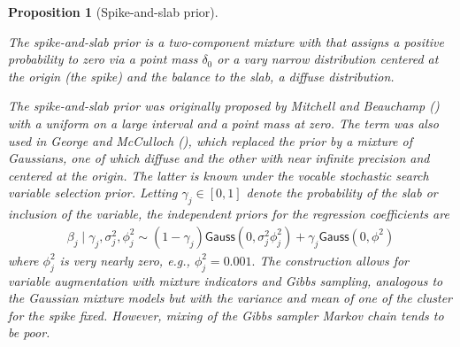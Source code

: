 \documentclass[
  11pt,
  letterpaper,
]{scrbook}
\theoremstyle{plain}
\theoremstyle{plain}
\newtheorem{proposition}{Proposition}[chapter]
\theoremstyle{definition}
\theoremstyle{definition}
\theoremstyle{definition}
\theoremstyle{plain}
\theoremstyle{remark}
\begin{document}
\begin{proposition}[Spike-and-slab
prior]\protect\hypertarget{prp-spike-slab}{}\label{prp-spike-slab}

The spike-and-slab prior is a two-component mixture with that assigns a
positive probability to zero via a point mass \(\delta_0\) or a vary
narrow distribution centered at the origin (the spike) and the balance
to the slab, a diffuse distribution.

The spike-and-slab prior was originally proposed by Mitchell and
Beauchamp () with a uniform
on a large interval and a point mass at zero. The term was also used in
George and McCulloch (), which
replaced the prior by a mixture of Gaussians, one of which diffuse and
the other with near infinite precision and centered at the origin. The
latter is known under the vocable stochastic search variable selection
prior. Letting \(\gamma_j \in [0,1]\) denote the probability of the slab
or inclusion of the variable, the independent priors for the regression
coefficients are \begin{align*}
 \beta_j \mid \gamma_j, \sigma_j^2,\phi^2_j \sim (1-\gamma_j) \mathsf{Gauss}(0, \sigma_j^2\phi^2_j) + \gamma_j \mathsf{Gauss}(0, \phi^2)
\end{align*} where \(\phi^2_j\) is very nearly zero, e.g.,
\(\phi_j^2=0.001.\) The construction allows for variable augmentation
with mixture indicators and Gibbs sampling, analogous to the Gaussian
mixture models but with the variance and mean of one of the cluster for
the spike fixed. However, mixing of the Gibbs sampler Markov chain tends
to be poor.

\end{proposition}
\end{document}
